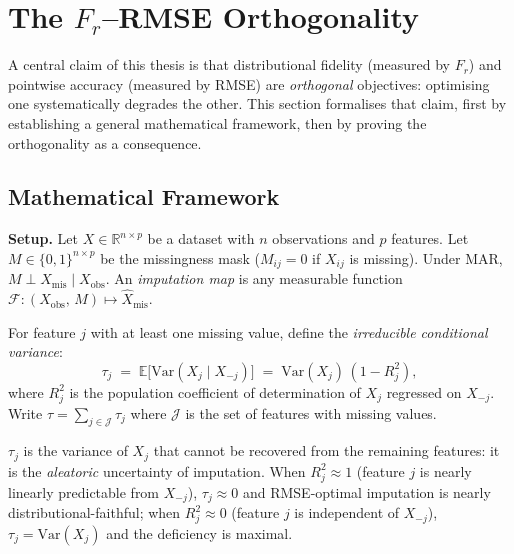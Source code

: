 
\section{The \texorpdfstring{$F_r$}{Fr}--RMSE Orthogonality}
\label{sec:orthogonality}

A central claim of this thesis is that distributional fidelity (measured by $F_r$) and pointwise accuracy (measured by RMSE) are \emph{orthogonal} objectives: optimising one systematically degrades the other. This section formalises that claim, first by establishing a general mathematical framework, then by proving the orthogonality as a consequence.

\subsection{Mathematical Framework}
\label{sec:orthogonality_framework}

\textbf{Setup.} Let $X \in \mathbb{R}^{n \times p}$ be a dataset with $n$ observations and $p$ features. Let $M \in \{0,1\}^{n \times p}$ be the missingness mask ($M_{ij} = 0$ if $X_{ij}$ is missing). Under MAR, $M \perp X_{\mathrm{mis}} \mid X_{\mathrm{obs}}$. An \emph{imputation map} is any measurable function $\mathcal{F}: (X_{\mathrm{obs}},\, M) \mapsto \hat{X}_{\mathrm{mis}}$.

\begin{definition}
\label{def:tau}
For feature $j$ with at least one missing value, define the \emph{irreducible conditional variance}:
\begin{equation}
    \tau_j \;=\; \mathbb{E}\!\bigl[\mathrm{Var}(X_j \mid X_{-j})\bigr]
              \;=\; \mathrm{Var}(X_j)\,(1 - R_j^2),
    \label{eq:tau_j}
\end{equation}
where $R_j^2$ is the population coefficient of determination of $X_j$ regressed on $X_{-j}$.
Write $\tau = \sum_{j \in \mathcal{J}} \tau_j$ where $\mathcal{J}$ is the set of features with missing values.
\end{definition}

$\tau_j$ is the variance of $X_j$ that cannot be recovered from the remaining features: it is the \emph{aleatoric} uncertainty of imputation.  When $R_j^2 \approx 1$ (feature $j$ is nearly linearly predictable from $X_{-j}$), $\tau_j \approx 0$ and RMSE-optimal imputation is nearly distributional-faithful; when $R_j^2 \approx 0$ (feature $j$ is independent of $X_{-j}$), $\tau_j = \mathrm{Var}(X_j)$ and the deficiency is maximal.

